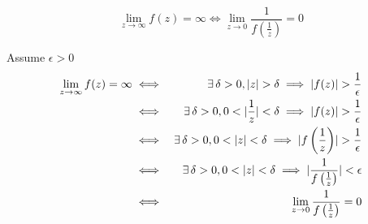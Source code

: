 \documentclass[letterpaper,12pt,fleqn]{article}
\renewcommand{\d}{\delta}
\newcommand{\e}{\epsilon}
\newcommand{\limi}{\lim_{z\to\infty}}
\newcommand{\limo}{\lim_{z\to0}}
\begin{document}
\begin{theorem}
  \listbreak
  \[\limi{f(z)}=\infty\iff\limo{\frac{1}{f\left(\frac{1}{z}\right)}}=0\]
\end{theorem}

\begin{theproof}
  Assume $\e>0$
  \begin{eqnarray*}
    \limi{f(z)}=\infty &\iff&
    \exists\,\d>0,\abs{z}>\d\implies\abs{f(z)}>\frac{1}{\e} \\
    &\iff& \exists\,\d>0,0<\abs{\frac{1}{z}}<\d\implies
    \abs{f(z)}>\frac{1}{\e} \\
    &\iff& \exists\,\d>0,0<\abs{z}<\d\implies
    \abs{f\left(\frac{1}{z}\right)}>\frac{1}{\e} \\
    &\iff& \exists\,\d>0,0<\abs{z}<\d\implies
    \abs{\frac{1}{f\left(\frac{1}{z}\right)}}<\e \\
    &\iff& \limo{\frac{1}{f\left(\frac{1}{z}\right)}}=0 \\
  \end{eqnarray*}
\end{theproof}
\end{document}
